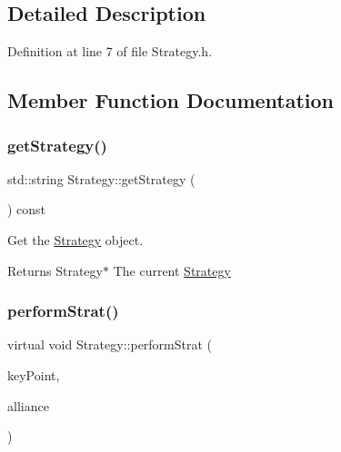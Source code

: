 \subsection{Detailed Description}


Definition at line 7 of file Strategy.\+h.



\subsection{Member Function Documentation}
\mbox{\label{classStrategy_adcafe7126d3ada2f0a48ea5c3d23471c}} 
\subsubsection{\texorpdfstring{get\+Strategy()}{getStrategy()}}
{\footnotesize\ttfamily std\+::string Strategy\+::get\+Strategy (\begin{DoxyParamCaption}{ }\end{DoxyParamCaption}) const}



Get the \hyperlink{classStrategy}{Strategy} object. 

\begin{DoxyReturn}{Returns}
Strategy$\ast$ The current \hyperlink{classStrategy}{Strategy} 
\end{DoxyReturn}
\mbox{\label{classStrategy_aa0692005cb67d0ee2441046f6b302e7d}} 
\subsubsection{\texorpdfstring{perform\+Strat()}{performStrat()}}
{\footnotesize\ttfamily virtual void Strategy\+::perform\+Strat (\begin{DoxyParamCaption}\item[{\hyperlink{classKeyPoint}{Key\+Point} $\ast$}]{key\+Point,  }\item[{\hyperlink{classAlliance}{Alliance} $\ast$}]{alliance }\end{DoxyParamCaption})\hspace{0.3cm}{\ttfamily [pure virtual]}}



